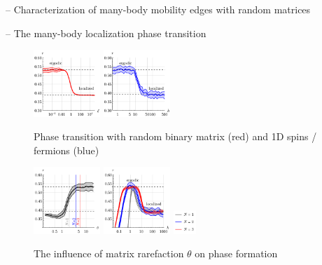 \cite{wei_characterization_2020} -- Characterization of many-body mobility edges with random matrices


\cite{pal_many-body_2010} -- The many-body localization phase transition



\begin{figure}[h]
    \centering
    \includegraphics[width=0.225\textwidth]{imgs/erg_reg_add1.pdf}
    \hspace{10 mm} 
    \includegraphics[width=0.225\textwidth]{imgs/erg_reg_add2.pdf}
    \caption{Phase transition with random binary matrix (red) and 1D  spins / fermions (blue)}
\end{figure}


\begin{figure}[h]
    \centering
    \includegraphics[align=c, width=0.225\textwidth]{imgs/ergodic_reg.pdf}
    \hspace{10 mm} 
    \includegraphics[align=c, width=0.225\textwidth]{imgs/transition.pdf}
    \hspace{5 mm} 
    \includegraphics[align=c, width=0.075\textwidth]{imgs/transition_leg.pdf}
    \caption{
    	The influence of matrix rarefaction $\theta$ on phase formation 
    }
\end{figure}
